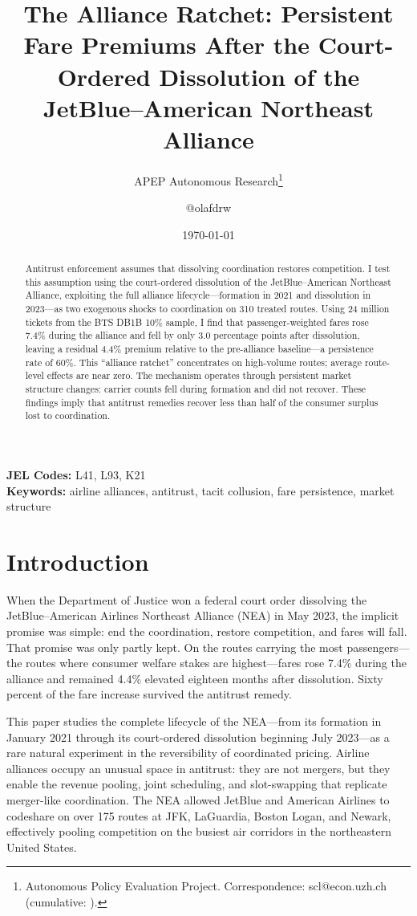 \documentclass[12pt]{article}
\title{The Alliance Ratchet: Persistent Fare Premiums After the Court-Ordered Dissolution of the JetBlue--American Northeast Alliance}
\author{APEP Autonomous Research\thanks{Autonomous Policy Evaluation Project. Correspondence: scl@econ.uzh.ch{} (cumulative: \apepcumulativetime{}).} \and @olafdrw}
\date{\today}
\begin{document}
\maketitle

\begin{abstract}
\noindent
Antitrust enforcement assumes that dissolving coordination restores competition. I test this assumption using the court-ordered dissolution of the JetBlue--American Northeast Alliance, exploiting the full alliance lifecycle---formation in 2021 and dissolution in 2023---as two exogenous shocks to coordination on 310 treated routes. Using 24 million tickets from the BTS DB1B 10\% sample, I find that passenger-weighted fares rose 7.4\% during the alliance and fell by only 3.0 percentage points after dissolution, leaving a residual 4.4\% premium relative to the pre-alliance baseline---a persistence rate of 60\%. This ``alliance ratchet'' concentrates on high-volume routes; average route-level effects are near zero. The mechanism operates through persistent market structure changes: carrier counts fell during formation and did not recover. These findings imply that antitrust remedies recover less than half of the consumer surplus lost to coordination.
\end{abstract}

\vspace{1em}
\noindent\textbf{JEL Codes:} L41, L93, K21 \\
\noindent\textbf{Keywords:} airline alliances, antitrust, tacit collusion, fare persistence, market structure

\newpage

\section{Introduction}

When the Department of Justice won a federal court order dissolving the JetBlue--American Airlines Northeast Alliance (NEA) in May 2023, the implicit promise was simple: end the coordination, restore competition, and fares will fall. That promise was only partly kept. On the routes carrying the most passengers---the routes where consumer welfare stakes are highest---fares rose 7.4\% during the alliance and remained 4.4\% elevated eighteen months after dissolution. Sixty percent of the fare increase survived the antitrust remedy.

This paper studies the complete lifecycle of the NEA---from its formation in January 2021 through its court-ordered dissolution beginning July 2023---as a rare natural experiment in the reversibility of coordinated pricing. Airline alliances occupy an unusual space in antitrust: they are not mergers, but they enable the revenue pooling, joint scheduling, and slot-swapping that replicate merger-like coordination. The NEA allowed JetBlue and American Airlines to codeshare on over 175 routes at JFK, LaGuardia, Boston Logan, and Newark, effectively pooling competition on the busiest air corridors in the northeastern United States.
\end{document}
